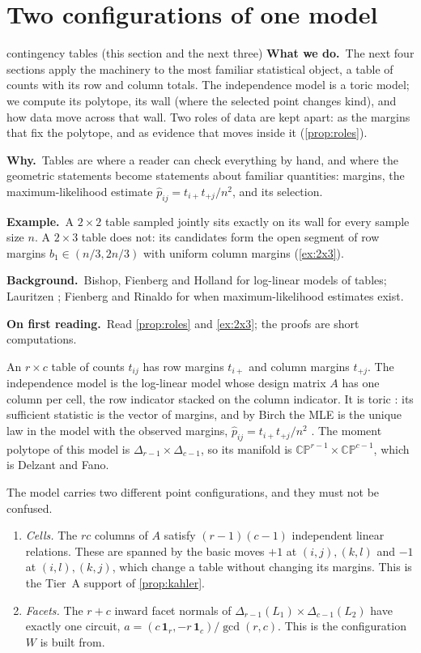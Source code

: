 \documentclass[11pt]{article}
\theoremstyle{definition}\newtheorem{definition}[theorem]{Definition}\newtheorem{remark}[theorem]{Remark}\newtheorem{example}[theorem]{Example}\newtheorem{problem}[theorem]{Open problem}\crefname{problem}{Problem}{Problems}
\newcommand{\rbwhat}{\textcolor{rbWhat}{\textbf{What we do.}}~}\newcommand{\rbwhy}{\par\smallskip\textcolor{rbWhy}{\textbf{Why.}}~}
\newcommand{\rbex}{\par\smallskip\textcolor{rbEx}{\textbf{Example.}}~}\newcommand{\rbbg}{\par\smallskip\textcolor{rbBg}{\textbf{Background.}}~}
\newcommand{\rbfirst}{\par\smallskip\textcolor{rbFirst}{\textbf{On first reading.}}~}
\begin{document}
\section{Two configurations of one model}\label{sec:twoconf}
\begin{readerbox}{contingency tables (this section and the next three)}
\rbwhat The next four sections apply the machinery to the most familiar statistical object, a table of counts with its row and column totals. The independence model is a toric model; we compute its polytope, its wall (where the selected point changes kind), and how data move across that wall. Two roles of data are kept apart: as the margins that fix the polytope, and as evidence that moves inside it (\cref{prop:roles}).
\rbwhy Tables are where a reader can check everything by hand, and where the geometric statements become statements about familiar quantities: margins, the maximum-likelihood estimate $\hat p_{ij}=t_{i+}t_{+j}/n^2$, and its selection.
\rbex A $2\times2$ table sampled jointly sits exactly on its wall for every sample size $n$. A $2\times3$ table does not: its candidates form the open segment of row margins $b_1\in(n/3,2n/3)$ with uniform column margins (\cref{ex:2x3}).
\rbbg Bishop, Fienberg and Holland \cite{BishopFienbergHolland1975} for log-linear models of tables; Lauritzen \cite{Lauritzen1996}; Fienberg and Rinaldo \cite{FienbergRinaldo2012} for when maximum-likelihood estimates exist.
\rbfirst Read \cref{prop:roles} and \cref{ex:2x3}; the proofs are short computations.
\end{readerbox}
An $r\times c$ table of counts $t_{ij}$ has row margins $t_{i+}$ and column margins $t_{+j}$. The independence model is the log-linear model whose design
matrix $A$ has one column per cell, the row indicator stacked on the column indicator. It is toric \cite{DiaconisSturmfels1998,GeigerMeekSturmfels2006}: its sufficient
statistic is the vector of margins, and by Birch the MLE is the unique law in the model with the observed margins, $\hat p_{ij}=t_{i+}t_{+j}/n^2$
\cite{Birch1963,BishopFienbergHolland1975}. The moment polytope of this model is $\Delta_{r-1}\times\Delta_{c-1}$, so its manifold is $\mathbb{CP}^{r-1}\times\mathbb{CP}^{c-1}$, which is Delzant and Fano.

The model carries two different point configurations, and they must not be confused.
\begin{proposition}\label{prop:twoconf}
\begin{enumerate}
\item[(1)] \emph{Cells.} The $rc$ columns of $A$ satisfy $(r-1)(c-1)$ independent linear relations. These are spanned by the basic moves $+1$ at $(i,j),(k,l)$ and $-1$ at $(i,l),(k,j)$,
  which change a table without changing its margins. This is the Tier~A support of \cref{prop:kahler}.
\item[(2)] \emph{Facets.} The $r+c$ inward facet normals of $\Delta_{r-1}(L_1)\times\Delta_{c-1}(L_2)$ have exactly one circuit, $a=(c\,\mathbf 1_r,-r\,\mathbf 1_c)/\gcd(r,c)$. This is the configuration $W$ is built from.
\end{enumerate}
\end{proposition}
\end{document}
